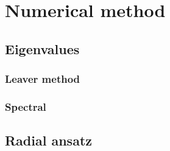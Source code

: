 
\chapter{Numerical method} %
\label{Chapter4}


\section{Eigenvalues}

\subsection{Leaver method}
\subsection{Spectral}

\section{Radial ansatz}




\cleardoublepage